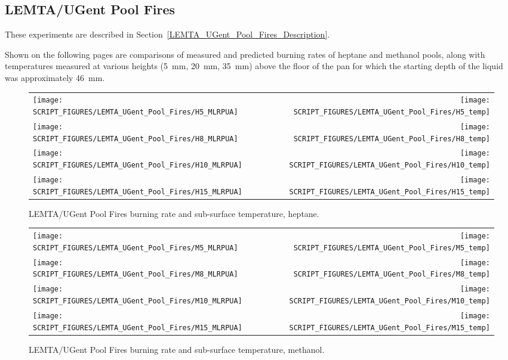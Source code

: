 \clearpage

\subsection{LEMTA/UGent Pool Fires}

These experiments are described in Section~\ref{LEMTA_UGent_Pool_Fires_Description}.

Shown on the following pages are comparisons of measured and predicted burning rates of heptane and methanol pools, along with temperatures measured at various heights (5~mm, 20~mm, 35~mm) above the floor of the pan for which the starting depth of the liquid was approximately 46~mm.

\newpage

\begin{figure}[p]
\begin{tabular*}{\textwidth}{l@{\extracolsep{\fill}}r}
\texttt{[image: SCRIPT\_FIGURES/LEMTA\_UGent\_Pool\_Fires/H5\_MLRPUA]} &
\texttt{[image: SCRIPT\_FIGURES/LEMTA\_UGent\_Pool\_Fires/H5\_temp]} \\
\texttt{[image: SCRIPT\_FIGURES/LEMTA\_UGent\_Pool\_Fires/H8\_MLRPUA]} &
\texttt{[image: SCRIPT\_FIGURES/LEMTA\_UGent\_Pool\_Fires/H8\_temp]} \\
\texttt{[image: SCRIPT\_FIGURES/LEMTA\_UGent\_Pool\_Fires/H10\_MLRPUA]} &
\texttt{[image: SCRIPT\_FIGURES/LEMTA\_UGent\_Pool\_Fires/H10\_temp]} \\
\texttt{[image: SCRIPT\_FIGURES/LEMTA\_UGent\_Pool\_Fires/H15\_MLRPUA]} &
\texttt{[image: SCRIPT\_FIGURES/LEMTA\_UGent\_Pool\_Fires/H15\_temp]}
\end{tabular*}
\caption[LEMTA/UGent Pool Fires burning rate and sub-surface temperature, heptane]{LEMTA/UGent Pool Fires burning rate and sub-surface temperature, heptane.}
\label{LEMTA_UGent_heptane}
\end{figure}

\begin{figure}[p]
\begin{tabular*}{\textwidth}{l@{\extracolsep{\fill}}r}
\texttt{[image: SCRIPT\_FIGURES/LEMTA\_UGent\_Pool\_Fires/M5\_MLRPUA]} &
\texttt{[image: SCRIPT\_FIGURES/LEMTA\_UGent\_Pool\_Fires/M5\_temp]} \\
\texttt{[image: SCRIPT\_FIGURES/LEMTA\_UGent\_Pool\_Fires/M8\_MLRPUA]} &
\texttt{[image: SCRIPT\_FIGURES/LEMTA\_UGent\_Pool\_Fires/M8\_temp]} \\
\texttt{[image: SCRIPT\_FIGURES/LEMTA\_UGent\_Pool\_Fires/M10\_MLRPUA]} &
\texttt{[image: SCRIPT\_FIGURES/LEMTA\_UGent\_Pool\_Fires/M10\_temp]} \\
\texttt{[image: SCRIPT\_FIGURES/LEMTA\_UGent\_Pool\_Fires/M15\_MLRPUA]} &
\texttt{[image: SCRIPT\_FIGURES/LEMTA\_UGent\_Pool\_Fires/M15\_temp]}
\end{tabular*}
\caption[LEMTA/UGent Pool Fires burning rate and sub-surface temperature, methanol]{LEMTA/UGent Pool Fires burning rate and sub-surface temperature, methanol.}
\label{LEMTA_UGent_methanol}
\end{figure}



